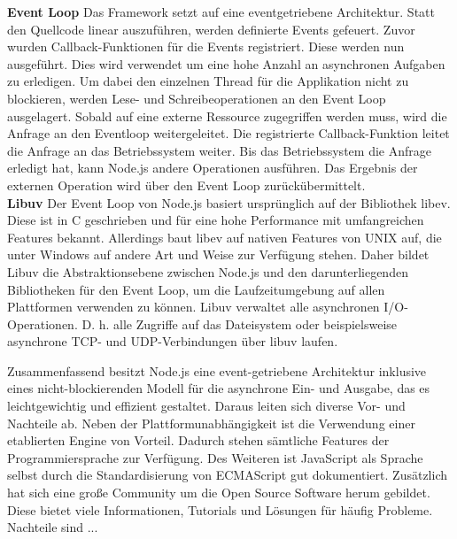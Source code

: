 \noindent
\textbf{Event Loop} \newline
Das Framework setzt auf eine eventgetriebene Architektur. Statt den Quellcode linear auszuführen, werden definierte Events gefeuert. Zuvor wurden Callback-Funktionen für die Events registriert. Diese werden nun ausgeführt. Dies wird verwendet um eine hohe Anzahl an asynchronen Aufgaben zu erledigen. Um dabei den einzelnen Thread für die Applikation nicht zu blockieren, werden Lese- und Schreibeoperationen an den Event Loop ausgelagert. Sobald auf eine externe Ressource zugegriffen werden muss, wird die Anfrage an den Eventloop weitergeleitet. Die registrierte Callback-Funktion leitet die Anfrage an das Betriebssystem weiter. Bis das Betriebssystem die Anfrage erledigt hat, kann Node.js andere Operationen ausführen. Das Ergebnis der externen Operation wird über den Event Loop zurückübermittelt. \cite{Springer.2022} \\

\noindent
\textbf{Libuv} \newline
Der Event Loop von Node.js basiert ursprünglich auf der Bibliothek libev. Diese ist in C geschrieben und für eine hohe Performance mit umfangreichen Features bekannt. Allerdings baut libev auf nativen Features von UNIX auf, die unter Windows auf andere Art und Weise zur Verfügung stehen. Daher bildet Libuv die Abstraktionsebene zwischen Node.js und den darunterliegenden Bibliotheken für den Event Loop, um die Laufzeitumgebung auf allen Plattformen verwenden zu können. Libuv verwaltet alle asynchronen I/O-Operationen. D. h. alle Zugriffe auf das Dateisystem oder beispielsweise asynchrone TCP- und UDP-Verbindungen über libuv laufen. \cite{Springer.2022} \\ 

\noindent
Zusammenfassend besitzt Node.js eine event-getriebene Architektur inklusive eines nicht-blockierenden Modell für die asynchrone Ein- und Ausgabe, das es leichtgewichtig und effizient gestaltet. Daraus leiten sich diverse Vor- und Nachteile ab. \newline
Neben der Plattformunabhängigkeit ist die Verwendung einer etablierten Engine von Vorteil. Dadurch stehen sämtliche Features der Programmiersprache zur Verfügung. Des Weiteren ist JavaScript als Sprache selbst durch die Standardisierung von ECMAScript gut dokumentiert.  Zusätzlich hat sich eine große Community um die Open Source Software herum gebildet. Diese bietet viele Informationen, Tutorials und Lösungen für häufig Probleme. \cite{Springer.2022} \newline
Nachteile sind ...  \\

